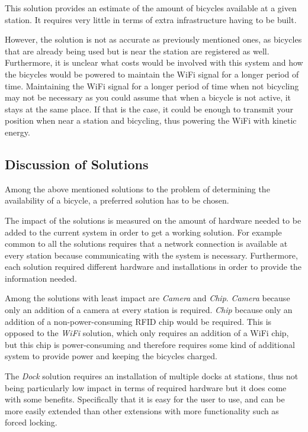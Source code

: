 This solution provides an estimate of the amount of bicycles available at a given station.
It requires very little in terms of extra infrastructure having to be built.

However, the solution is not as accurate as previously mentioned ones, as bicycles that are already being used but is near the station are registered as well.
Furthermore, it is unclear what costs would be involved with this system and how the bicycles would be powered to maintain the WiFi signal for a longer period of time. 
Maintaining the WiFi signal for a longer period of time when not bicycling may not be necessary as you could assume that when a bicycle is not active, it stays at the same place.
If that is the case, it could be enough to transmit your position when near a station and bicycling, thus powering the WiFi with kinetic energy.

\subsection{Discussion of Solutions}
Among the above mentioned solutions to the problem of determining the availability of a bicycle, a preferred solution has to be chosen. 

The impact of the solutions is measured on the amount of hardware needed to be added to the current system in order to get a working solution. 
For example common to all the solutions requires that a network connection is available at every station because communicating with the system is necessary. 
Furthermore, each solution required different hardware and installations in order to provide the information needed. 

Among the solutions with least impact are \textit{Camera} and \textit{Chip}. 
\textit{Camera} because only an addition of a camera at every station is required. 
\textit{Chip} because only an addition of a non-power-consuming RFID chip would be required.
This is opposed to the \textit{WiFi} solution, which only requires an addition of a WiFi chip, but this chip is power-consuming and therefore requires some kind of additional system to provide power and keeping the bicycles charged.

The \textit{Dock} solution requires an installation of multiple docks at stations, thus not being particularly low impact in terms of required hardware but it does come with some benefits.
Specifically that it is easy for the user to use, and can be more easily extended than other extensions with more functionality such as forced locking.

